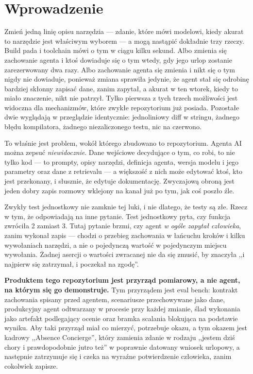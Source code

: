 \documentclass[11pt,a4paper]{article}
\newcommand{\finding}[1]{{\color{primaryblue}\textbf{#1}}}
\begin{document}
\vspace{0.4cm}

\section{Wprowadzenie}

Zmień jedną linię opisu narzędzia --- zdanie, które mówi modelowi, kiedy
akurat to narzędzie jest właściwym wyborem --- a mogą nastąpić dokładnie trzy
rzeczy. Build pada i toolchain mówi o tym w ciągu kilku
sekund. Albo zmienia się zachowanie agenta i ktoś dowiaduje się o tym wtedy,
gdy jego urlop zostanie zarezerwowany dwa razy. Albo zachowanie agenta się
zmienia i nikt się o tym nigdy nie dowiaduje, ponieważ zmiana sprawiła jedynie,
że agent stał się odrobinę bardziej skłonny zapisać dane, zanim zapytał, a
akurat w ten wtorek, kiedy to miało znaczenie, nikt nie patrzył. Tylko pierwsza
z tych trzech możliwości jest widoczna dla mechanizmów, które zwykłe
repozytorium już posiada. Pozostałe dwie wyglądają w przeglądzie identycznie:
jednoliniowy diff w stringu, żadnego błędu kompilatora, żadnego
niezaliczonego testu, nic na czerwono.

To właśnie jest problem, wokół którego zbudowano to repozytorium. Agenta AI
można zepsuć \emph{niewidocznie}. Dane wejściowe decydujące o tym, co robi, to
nie tylko kod --- to prompty, opisy narzędzi, definicja agenta, wersja modelu i
jego parametry oraz dane z retrievalu --- a większość z nich może
edytować ktoś, kto jest przekonany, i słusznie, że edytuje dokumentację.
Zwyczajową obroną jest jeden dobry zapis rozmowy wklejony na kanał już po tym,
jak coś poszło źle.

Zwykły test jednostkowy nie zamknie tej luki, i nie dlatego, że testy są złe.
Rzecz w tym, że odpowiadają na inne pytanie. Test jednostkowy pyta, czy funkcja
zwróciła 2 zamiast 3. Tutaj pytanie brzmi, czy agent \emph{w ogóle zapytał
człowieka}, zanim wykonał zapis --- chodzi o przebieg zachowania w łańcuchu
kroków i kilku wywołaniach narzędzi, a nie o pojedynczą wartość w pojedynczym
miejscu wywołania. Żadnej asercji o wartości zwracanej nie da się zmusić, by
znaczyła ,,i najpierw się zatrzymał, i poczekał na zgodę''.

\finding{Produktem tego repozytorium jest przyrząd pomiarowy, a nie agent, na
którym się go demonstruje.} Tym przyrządem jest eval bench: kontrakt
zachowania spisany przed agentem, scenariusze przechowywane jako dane,
produkcyjny agent odtwarzany w procesie przy każdej zmianie, ślad wykonania
jako artefakt podlegający ocenie oraz bramka scalania blokująca na podstawie
wyniku. Aby taki przyrząd miał co mierzyć, potrzebuje okazu, a tym okazem jest
kadrowy ,,Absence Concierge'', który zamienia zdanie w rodzaju ,,jestem dziś
chory i prawdopodobnie jutro też'' w poprawnie datowany wniosek urlopowy, a
następnie zatrzymuje się i czeka na wyraźne potwierdzenie człowieka, zanim
cokolwiek zapisze.
\end{document}
